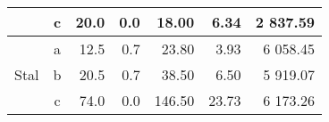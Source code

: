 \begin{table}[H]
{\begin{tabular}{|c|c|r|r|r|r|r|}
                                                                                                     & c        & 20.0                                                                               & 0.0                                                                                   & 18.00                                                                             & 6.34                                                                                        & 2 837.59                                                                      \\ \hline
    \multirow{3}{*}{Stal}                                                                            & a        & 12.5                                                                               & 0.7                                                                                   & 23.80                                                                             & 3.93                                                                                        & 6 058.45                                                                      \\ \cline{2-7} 
                                                                                                     & b        & 20.5                                                                               & 0.7                                                                                   & 38.50                                                                             & 6.50                                                                                        & 5 919.07                                                                      \\ \cline{2-7} 
                                                                                                     & c        & 74.0                                                                               & 0.0                                                                                   & 146.50                                                                            & 23.73                                                                                       & 6 173.26                                                                      \\ \hline
    \end{tabular}%
    }
    \end{table}